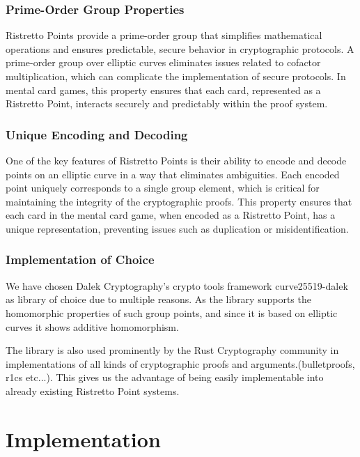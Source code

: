\documentclass[12pt,a4paper]{report}
\begin{document}
\subsection*{Prime-Order Group Properties}
Ristretto Points provide a prime-order group that simplifies 
mathematical operations and ensures predictable, 
secure behavior in cryptographic protocols.
A prime-order group over elliptic curves eliminates issues related to cofactor multiplication, which can complicate the implementation of secure protocols.
In mental card games, this property ensures that each card, represented as a Ristretto Point, interacts securely and predictably within the proof system.

\subsection*{Unique Encoding and Decoding}
One of the key features of Ristretto Points is their ability to encode and decode points on an elliptic curve in a way that eliminates ambiguities.
Each encoded point uniquely corresponds to a single group element, which is critical for maintaining the integrity of the cryptographic proofs.
This property ensures that each card in the mental card game, when encoded as a Ristretto Point, has a unique representation, preventing issues such as duplication or misidentification.

\subsection*{Implementation of Choice}
We have chosen Dalek Cryptography's crypto tools framework curve25519-dalek\cite{dalek:curve}
as library of choice due to multiple reasons.
As the library supports the homomorphic properties of such group points, and since it is based on elliptic curves it shows additive homomorphism.\par
The library is also used prominently by the Rust Cryptography community in 
implementations of all kinds of cryptographic proofs and arguments.(bulletproofs, r1cs etc...). This gives us the advantage of being easily implementable into already existing Ristretto Point systems.


\chapter{Implementation}
\end{document}
